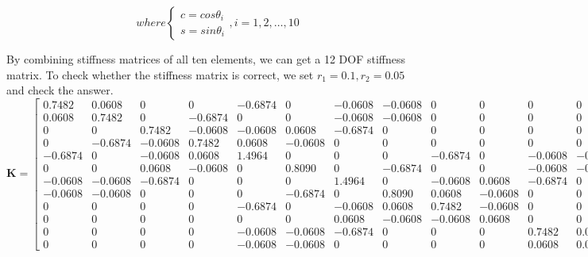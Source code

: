 \documentclass[12pt, a4paper]{article}
\begin{document}
    \begin{equation*}
        \qquad where
    \left\{
        \begin{array}{c}
            c=cos\theta_i\\
            s=sin\theta_i
        \end{array}
    \right.
        , i=1,2,\ldots,10
    \end{equation*}
        
        
    \qquad By combining stiffness matrices of all ten elements, we can get a 12 DOF stiffness matrix. To check whether the stiffness matrix is correct, we set $r_1=0.1,r_2=0.05$ and check the answer.
    \begin{equation*}
        \mathbf{K}=
        \left[
        \begin{smallmatrix}
            0.7482  &  0.0608  &       0  &       0 &  -0.6874 &        0 &  -0.0608 &  -0.0608 &        0 &        0 &        0 &        0\\
            0.0608 &   0.7482  &       0  & -0.6874 &        0 &        0 &  -0.0608 &  -0.0608 &        0 &        0 &        0 &        0\\
                 0  &       0  &  0.7482  & -0.0608 &  -0.0608 &   0.0608 &  -0.6874 &        0 &        0 &        0 &        0 &        0\\
                 0  & -0.6874  & -0.0608  &  0.7482 &   0.0608 &  -0.0608 &        0 &        0 &        0 &        0 &        0 &        0\\
           -0.6874  &       0  & -0.0608  &  0.0608 &   1.4964 &        0 &        0 &        0 &  -0.6874 &        0 &  -0.0608 &  -0.0608\\
                 0  &       0  &  0.0608  & -0.0608 &        0 &   0.8090 &        0 &  -0.6874 &        0 &        0 &  -0.0608 &  -0.0608\\
           -0.0608  & -0.0608  & -0.6874  &       0 &        0 &        0 &   1.4964 &        0 &  -0.0608 &   0.0608 &  -0.6874 &        0\\
           -0.0608  & -0.0608  &       0  &       0 &        0 &  -0.6874 &        0 &   0.8090 &   0.0608 &  -0.0608 &        0 &        0\\
                 0  &       0  &       0  &       0 &  -0.6874 &        0 &  -0.0608 &   0.0608 &   0.7482 &  -0.0608 &        0 &        0\\
                 0  &       0  &       0  &       0 &        0 &        0 &   0.0608 &  -0.0608 &  -0.0608 &   0.0608 &        0 &        0\\
                 0  &       0  &       0  &       0 &  -0.0608 &  -0.0608 &  -0.6874 &        0 &        0 &        0 &   0.7482 &   0.0608\\
                 0  &       0  &       0  &       0 &  -0.0608 &  -0.0608 &        0 &        0 &        0 &        0 &   0.0608 &   0.0608
        \end{smallmatrix}
        \right]
        \times 10^9
    \end{equation*}
      
\end{document}
